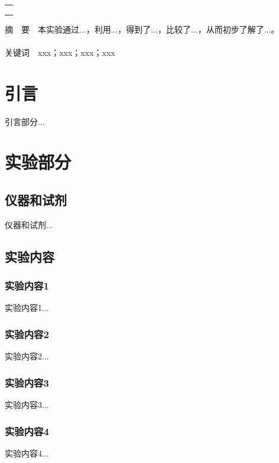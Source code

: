 \documentclass[12pt]{article}
\begin{document}
\begin{titlepage}
\begin{center}
            \begin{tabular*}{\textwidth}{c}
                \\ %
                \\ %
                \\ %
                \\ %
                \hline %
            \end{tabular*}
        \end{center}
        \textsf{摘\ \ 要}\ \ 本实验通过...，利用...，得到了...，比较了...，从而初步了解了...。
        \\
        \\
        \textsf{关键词}\ \ xxx；xxx；xxx；xxx
    \end{titlepage}

    \section{引言}
	引言部分...
               
	\vbox{}        
    \section{实验部分}
    	\subsection{仪器和试剂}
    	仪器和试剂...
    	
    	 \subsection{实验内容}
			\subsubsection{实验内容1}
			实验内容1...
			\subsubsection{实验内容2}
		实验内容2...
			\subsubsection{实验内容3}
			实验内容3...
			\subsubsection{实验内容4}
			实验内容4...
\end{document}
